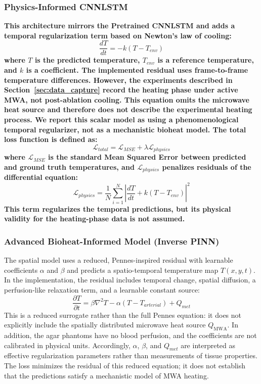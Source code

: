 \subsubsection{Physics-Informed CNNLSTM}
\begingroup
\color{red}\bfseries\boldmath
This architecture mirrors the Pretrained CNNLSTM and adds a temporal
regularization term based on Newton's law of cooling:
\begin{equation}
    \frac{dT}{dt} = -k(T - T_{env})
\end{equation}
where $T$ is the predicted temperature, $T_{env}$ is a reference temperature,
and $k$ is a coefficient. The implemented residual uses frame-to-frame
temperature differences. However, the experiments described in
Section~\ref{sec:data_capture} record the heating phase under active MWA, not
post-ablation cooling. This equation omits the microwave heat source and
therefore does not describe the experimental heating process. We report this
scalar model as using a phenomenological temporal regularizer, not as a
mechanistic bioheat model. The total loss function is defined as:
\begin{equation}
    \mathcal{L}_{total} = \mathcal{L}_{MSE} + \lambda \mathcal{L}_{physics}
\end{equation}
where $\mathcal{L}_{MSE}$ is the standard Mean Squared Error between
predicted and ground truth temperatures, and $\mathcal{L}_{physics}$ penalizes
residuals of the differential equation:
\begin{equation}
    \mathcal{L}_{physics} = \frac{1}{N} \sum_{i=1}^{N} \left| \frac{dT}{dt} + k(T - T_{env}) \right|^2
\end{equation}
This term regularizes the temporal predictions, but its physical validity for the heating-phase data is not assumed.
\endgroup

\subsubsection{Advanced Bioheat-Informed Model (Inverse PINN)}
The spatial model uses a reduced, Pennes-inspired residual with learnable coefficients $\alpha$ and $\beta$ and predicts a spatio-temporal temperature map $T(x,y,t)$. In the implementation, the residual includes temporal change, spatial diffusion, a perfusion-like relaxation term, and a learnable constant source:
\begin{equation}
    \frac{\partial T}{\partial t} = \beta \nabla^2 T - \alpha(T - T_{arterial}) + Q_{met}
\end{equation}
This is a reduced surrogate rather than the full Pennes equation: it does not explicitly include the spatially distributed microwave heat source $Q_{\mathrm{MWA}}$. In addition, the agar phantoms have no blood perfusion, and the coefficients are not calibrated in physical units. Accordingly, $\alpha$, $\beta$, and $Q_{met}$ are interpreted as effective regularization parameters rather than measurements of tissue properties. The loss minimizes the residual of this reduced equation; it does not establish that the predictions satisfy a mechanistic model of MWA heating.

